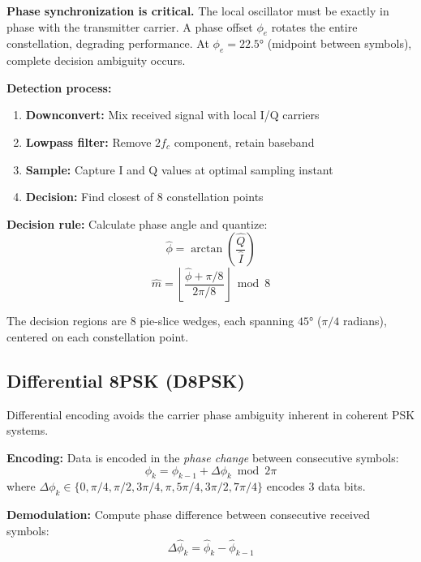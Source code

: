 \begin{warningbox}
\textbf{Phase synchronization is critical.} The local oscillator must be exactly in phase with the transmitter carrier. A phase offset $\phi_e$ rotates the entire constellation, degrading performance. At $\phi_e = 22.5°$ (midpoint between symbols), complete decision ambiguity occurs.
\end{warningbox}

\textbf{Detection process:}
\begin{enumerate}
\item \textbf{Downconvert:} Mix received signal with local I/Q carriers
\item \textbf{Lowpass filter:} Remove $2f_c$ component, retain baseband
\item \textbf{Sample:} Capture I and Q values at optimal sampling instant
\item \textbf{Decision:} Find closest of 8 constellation points
\end{enumerate}

\textbf{Decision rule:} Calculate phase angle and quantize:
\begin{equation}
\hat{\phi} = \arctan\left(\frac{\hat{Q}}{\hat{I}}\right)
\end{equation}
\begin{equation}
\hat{m} = \left\lfloor \frac{\hat{\phi} + \pi/8}{2\pi/8} \right\rfloor \bmod 8
\end{equation}

The decision regions are 8 pie-slice wedges, each spanning $45°$ ($\pi/4$ radians), centered on each constellation point.

\subsection{Differential 8PSK (D8PSK)}

Differential encoding avoids the carrier phase ambiguity inherent in coherent PSK systems.

\textbf{Encoding:} Data is encoded in the \emph{phase change} between consecutive symbols:
\begin{equation}
\phi_k = \phi_{k-1} + \Delta\phi_k \bmod 2\pi
\end{equation}
where $\Delta\phi_k \in \{0, \pi/4, \pi/2, 3\pi/4, \pi, 5\pi/4, 3\pi/2, 7\pi/4\}$ encodes 3 data bits.

\textbf{Demodulation:} Compute phase difference between consecutive received symbols:
\begin{equation}
\Delta\hat{\phi}_k = \hat{\phi}_k - \hat{\phi}_{k-1}
\end{equation}

